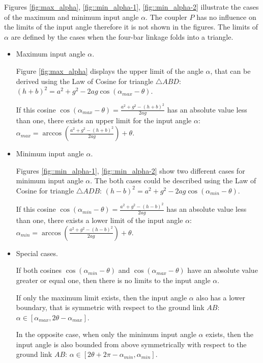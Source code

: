 \documentclass{article}
\begin{document}
 Figures \ref{fig:max_alpha}, \ref{fig::min_alpha-1}, \ref{fig::min_alpha-2} illustrate the cases of the maximum and minimum input angle $\alpha$. The coupler $P$ has no influence on the limits of the input angle therefore it is not shown in the figures. The limits of $\alpha$ are defined by the cases when the four-bar linkage folds into a triangle.
 
 \begin{itemize}
 \item Maximum input angle $\alpha$.
 
 Figure \ref{fig:max_alpha} displays the upper limit of the angle $\alpha$, that can be derived using the Law of Cosine for triangle $\triangle ABD$: $(h+b)^2 = a^2 + g^2 - 2 a g \cos(\alpha_{max}-\theta)$.
 
 If this cosine $\cos(\alpha_{max}-\theta) = \frac{a^2 + g^2 - (h+b)^2}{2 a g}$ has an absolute value less than one, there exists an upper limit for the input angle $\alpha$: $\alpha_{max} = \arccos(\frac{a^2 + g^2 - (h+b)^2}{2 a g}) + \theta$.
 
 \item Minimum input angle $\alpha$.
 
 Figures \ref{fig::min_alpha-1}, \ref{fig::min_alpha-2} show two different cases for minimum input angle $\alpha$. The both cases could be described using the Law of Cosine for triangle $\triangle ADB$: $(h-b)^2 = a^2 + g^2 - 2 a g \cos(\alpha_{min}-\theta)$.
 
 If this cosine $\cos(\alpha_{min}-\theta) = \frac{a^2 + g^2 - (h-b)^2}{2 a g}$ has an absolute value less than one, there exists a lower limit of the input angle $\alpha$: $\alpha_{min} = \arccos(\frac{a^2 + g^2 - (h-b)^2}{2 a g}) + \theta$.
 
 \item Special cases.
 
 If both cosines $\cos(\alpha_{min}-\theta)$ and $\cos(\alpha_{max}-\theta)$ have an absolute value greater or equal one, then there is no limits to the input angle $\alpha$.
 
 If only the maximum limit exists, then the input angle $\alpha$ also has a lower boundary, that is symmetric with respect to the ground link $AB$: $\alpha \in [\alpha_{max}, 2 \theta - \alpha_{max}]$.
 
 In the opposite case, when only the minimum input angle $\alpha$ exists, then the input angle is also bounded from above symmetrically with respect to the ground link $AB$: $\alpha \in [2 \theta + 2 \pi - \alpha_{min}, \alpha_{min}]$.
 \end{itemize}
 
\end{document}
